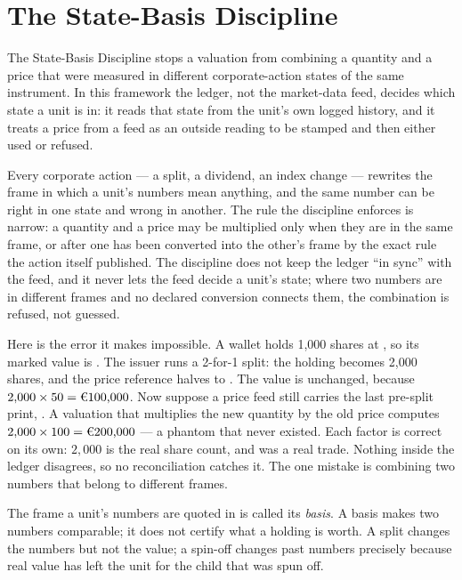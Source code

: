 \section{The State-Basis Discipline}
\label{sec:basis}
\label{sec:state-basis}

The State-Basis Discipline stops a valuation from combining a quantity and a price that were
measured in different corporate-action states of the same instrument. In this framework the
ledger, not the market-data feed, decides which state a unit is in: it reads that state from
the unit's own logged history, and it treats a price from a feed as an outside reading to be
stamped and then either used or refused.

Every corporate action --- a split, a dividend, an index change --- rewrites the frame in which
a unit's numbers mean anything, and the same number can be right in one state and wrong in another. The rule
the discipline enforces is narrow: a quantity and a price may be multiplied only when they are
in the same frame, or after one has been converted into the other's frame by the exact rule the
action itself published. The discipline does not keep the ledger ``in sync'' with the feed, and
it never lets the feed decide a unit's state; where two numbers are in different frames and no
declared conversion connects them, the combination is refused, not guessed.

Here is the error it makes impossible. A wallet holds 1{,}000 shares at , so its marked
value is . The issuer runs a 2-for-1 split: the holding becomes 2{,}000 shares,
and the price reference halves to . The value is unchanged, because $2{,}000\times50 =
\EUR{100{,}000}$. Now suppose a price feed still carries the last pre-split print, . A
valuation that multiplies the new quantity by the old price computes $2{,}000\times100 =
\EUR{200{,}000}$ --- a phantom  that never existed. Each factor is correct on its
own: $2{,}000$ is the real share count, and  was a real trade. Nothing inside the ledger
disagrees, so no reconciliation catches it. The one mistake is combining two numbers that belong
to different frames.

The frame a unit's numbers are quoted in is called its \emph{basis}. A basis makes two numbers
comparable; it does not certify what a holding is worth. A split changes the numbers but not the
value; a spin-off changes past numbers precisely because real value has left the unit for the
child that was spun off.

